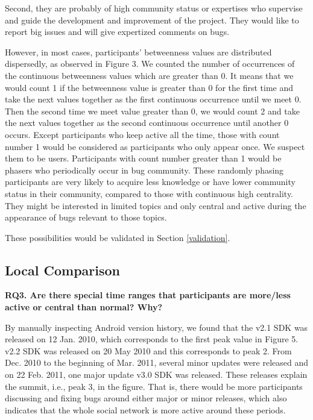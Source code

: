 \documentclass[10pt, conference, compsocconf]{IEEEtran}
\begin{document}
Second, they are probably of high community status or expertises who supervise and guide the development and improvement of the project. They would like to report big issues and will give expertized comments on bugs. 

However, in most cases, participants' betweenness values are distributed dispersedly, as observed in Figure 3. We counted the number of occurrences of the continuous betweenness values which are greater than 0. It means that we would count 1 if the betweenness value is greater than 0 for the first time and take the next values together as the first continuous occurrence until we meet 0. Then the second time we meet value greater than 0, we would count 2 and take the next values together as the second continuous occurrence until another 0 occurs. Except participants who keep active all the time, those with count number 1 would be considered as participants who only appear once. We suspect them to be users. Participants with count number greater than 1 would be phasers who periodically occur in bug community. These randomly phasing participants are very likely to acquire less knowledge or have lower community status in their community, compared to those with continuous high centrality. They might be interested in limited topics and only central and active during the appearance of bugs relevant to those topics.

These possibilities would be validated in Section \ref{validation}.

\subsection{Local Comparison}
\label{local}

\textbf{RQ3. Are there special time ranges that participants are more/less active or central than normal? Why?}

By manually inspecting Android version history, we found that the v2.1 SDK was released on 12 Jan. 2010, which corresponds to the first peak value in Figure 5. v2.2 SDK was released on 20 May 2010 and this corresponds to peak 2. From Dec. 2010 to the beginning of Mar. 2011, several minor updates were released and on 22 Feb. 2011, one major update v3.0 SDK was released. These releases explain the summit, i.e., peak 3, in the figure. That is, there would be more participants discussing and fixing bugs around either major or minor releases, which also indicates that the whole social network is more active around these periods.
\end{document}
